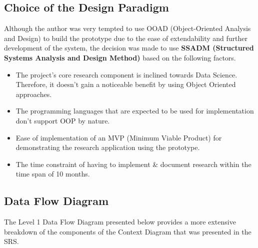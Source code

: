 \subsection{Choice of the Design Paradigm}
Although the author was very tempted to use OOAD (Object-Oriented Analysis and Design) to build the prototype due to the ease of extendability and further development of the system, the decision was made to use \textbf{SSADM (Structured Systems Analysis and Design Method)} based on the following factors.
\begin{itemize}
\item The project's core research component is inclined towards Data Science. Therefore, it doesn't gain a noticeable benefit by using Object Oriented approaches.
\item The programming languages that are expected to be used for implementation don't support OOP by nature.
\item Ease of implementation of an MVP (Minimum Viable Product) for demonstrating the research application using the prototype.
\item The time constraint of having to implement \& document research within the time span of 10 months.
\end{itemize}



\subsection{Data Flow Diagram}

The Level 1 Data Flow Diagram presented below provides a more extensive breakdown of the components of the Context Diagram that was presented in the SRS.


